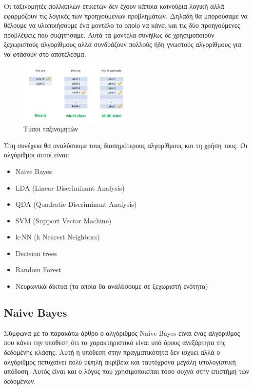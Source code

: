 Οι ταξινομητές πολλαπλών ετικετών δεν έχουν κάποια καινούρια
λογική αλλά εφαρμόζουν τις λογικές των προηγούμενων
προβλημάτων. Δηλαδή θα μπορούσαμε να θέλουμε να υλοποιήσουμε
ένα μοντέλο το οποίο να κάνει και τις δύο προηγούμενες
προβλέψεις που συζητήσαμε. Αυτά τα μοντέλα συνήθως δε
χρησιμοποιούν ξεχωριστούς αλγορίθμους αλλά συνδυάζουν
πολλούς ήδη γνωστούς αλγορίθμους για να φτάσουν στο
αποτέλεσμα.
\begin{figure}[H]
    \centering
    \includegraphics[width=0.5\textwidth]{images/typesOfClassifiers.png}
    \caption{Τύποι ταξινομητών}
\end{figure}

Στη συνέχεια θα αναλύσουμε τους διασημότερους αλγορίθμους
και τη χρήση τους. Οι αλγόριθμοι αυτοί είναι\cite{algo7, algo8, algo82}:
\begin{itemize}
    \item \textlatin{Naive Bayes}
    \item \textlatin{LDA (Linear Discriminant Analysis)}
    \item \textlatin{QDA (Quadratic Discriminant Analysis)}
    \item \textlatin{SVM (Support Vector Machine)}
    \item \textlatin{k-NN (k Nearest Neighbors)}
    \item \textlatin{Decision trees}
    \item \textlatin{Random Forest}
    \item Νευρωνικά δίκτυα (τα οποία θα αναλύσουμε σε ξεχωριστή ενότητα)
\end{itemize}

\subsection{\textlatin{Naive Bayes}}
Σύμφωνα με το παρακάτω άρθρο \cite{webb2010naive} ο αλγόριθμος \textlatin{Naive Bayes} είναι
ένας αλγόριθμος που κάνει την υπόθεση ότι τα χαρακτηριστικά είναι υπό όρους ανεξάρτητα της
δεδομένης κλάσης. Αυτή η υπόθεση στην πραγματικότητα δεν ισχύει αλλά ο αλγόριθμος πετυχαίνει
πολύ υψηλή ακρίβεια και ταυτόχρονα μεγάλη υπολογιστική απόδοση. Αυτός είναι και ο λόγος που
χρησιμοποιείται τόσο συχνά στην επιστήμη των δεδομένων.

